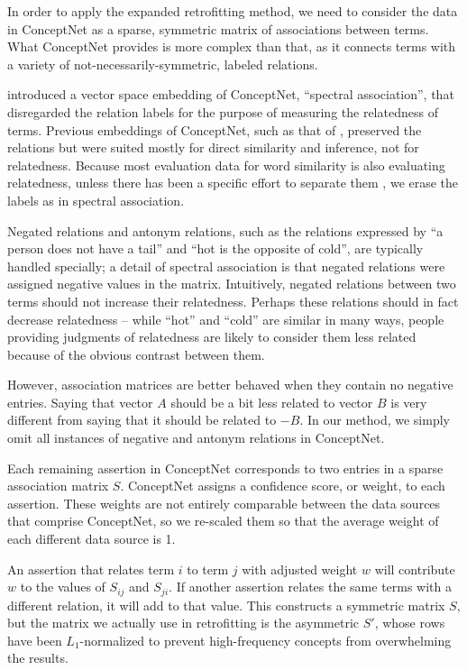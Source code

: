 \documentclass[11pt,letterpaper]{article}
\begin{document}
In order to apply the expanded retrofitting method, we need to consider the data in
ConceptNet as a sparse, symmetric matrix of associations between terms. What
ConceptNet provides is more complex than that, as it connects terms with a
variety of not-necessarily-symmetric, labeled relations.

 introduced a vector space embedding of ConceptNet,
``spectral association'', that disregarded the relation labels for the purpose
of measuring the relatedness of terms. Previous embeddings of ConceptNet, such
as that of , preserved the relations but were
suited mostly for direct similarity and inference, not for relatedness. Because
most evaluation data for word similarity is also evaluating relatedness, unless
there has been a specific effort to separate them \cite{agirre2009similarity},
we erase the labels as in spectral association.

Negated relations and antonym relations, such as the relations expressed by
``a person does not have a tail'' and ``hot is the opposite of cold'', are
typically handled specially; a detail of spectral association is that negated
relations were assigned negative values in the matrix. Intuitively, negated
relations between two terms should not increase their relatedness. Perhaps
these relations should in fact decrease relatedness -- while ``hot'' and
``cold'' are similar in many ways, people providing judgments of relatedness
are likely to consider them less related because of the obvious contrast
between them.

However, association matrices are better behaved when they contain no negative
entries. Saying that vector $A$ should be a bit less related to vector
$B$ is very different from saying that it should be related to $-B$.
In our method, we simply omit all instances of negative and antonym
relations in ConceptNet.

Each remaining assertion in ConceptNet corresponds to two entries in a sparse
association matrix $S$.  ConceptNet assigns a confidence score, or weight, to
each assertion.  These weights are not entirely comparable between the data
sources that comprise ConceptNet, so we re-scaled them so that the average
weight of each different data source is 1.

An assertion that relates term $i$ to term $j$ with adjusted weight $w$ will
contribute $w$ to the values of $S_{ij}$ and $S_{ji}$. If another assertion
relates the same terms with a different relation, it will add to that value.
This constructs a symmetric matrix $S$, but the matrix we actually use in
retrofitting is the asymmetric $S'$, whose rows have been $L_1$-normalized to
prevent high-frequency concepts from overwhelming the results.
\end{document}
